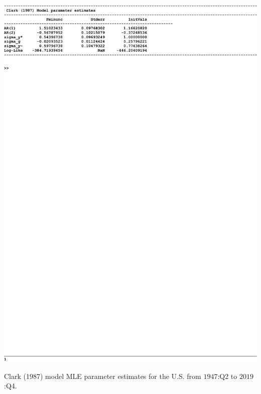 \documentclass[a4paper,final,12pt]{article}
\begin{document}
\begin{table}[h!]
\centering
\includegraphics[width=.75\textwidth,trim={0 0 0 25},clip]{Clark_MLE.pdf} \vspace*{-2.5mm}
\caption{Clark (1987) model MLE parameter estimates for the U.S. from $1947$:Q2 to $2019$:Q4.}
\label{tab:MLE}
\end{table}
\end{document}
